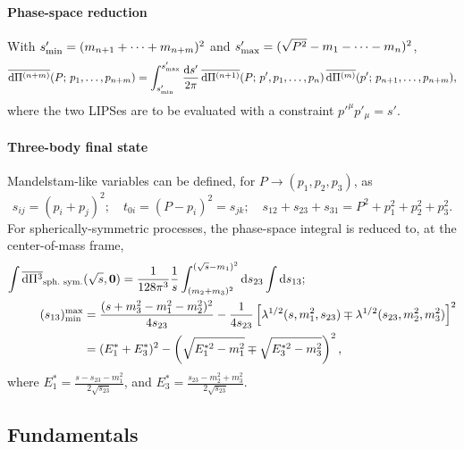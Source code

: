 \documentclass[CheatSheet]{subfiles}
\begin{document}
\paragraph{Phase-space reduction} With $s'\w{min}=(m_{n+1}+\cdots+m_{n+m})^2$ and $s'\w{max}=(\sqrt{P^2}-m_1-\cdots-m_n)^2$,
\begin{equation}
  \overline{\dd\Pi^{(n+m)}}(P;\,p_1,\dots,p_{n+m})
  =\int_{s'\w{min}}^{s'\w{max}}\frac{\dd s'}{2\pi}
  \,\overline{\dd\Pi^{(n+1)}}(P;\,p',p_{1},\dots,p_{n})
  \,\overline{\dd\Pi^{(m)}}(p';\,p_{n+1},\dots,p_{n+m}),
  \label{eq:psreduction}
\end{equation}
where the two LIPSes are to be evaluated with a constraint $p'^\mu p'_\mu=s'$.

\paragraph{Three-body final state} Mandelstam-like variables can be defined, for $P\to(p_1,p_2,p_3)$, as
\begin{equation*}
s_{ij}=(p_i+p_j)^2;\quad t_{0i}=(P-p_i)^2=s_{jk};\quad s_{12}+s_{23}+s_{31}=P^2+p_1^2+p_2^2+p_3^2.
\end{equation*}
For spherically-symmetric processes, the phase-space integral is reduced to, at the center-of-mass frame,
\begin{align}
\int\overline{\dd\Pi^3}_{\text{sph.\ sym.}}&(\sqrt{s}, \vc 0)
=\frac{1}{128\pi^3}\frac{1}{s}
\int_{(m_2+m_3)^2}^{(\sqrt{s}-m_1)^2}\dd s_{23}\int\dd s_{13};
\\ (s_{13})^{\text{max}}_{\text{min}} &=
\frac{(s+m_3^2-m_1^2-m_2^2)^2}{4s_{23}}
-\frac{1}{4s_{23}}
\left[\Kallen[1/2](s,m_1^2,s_{23})\mp\Kallen[1/2](s_{23},m_2^2,m_3^2)\right]^2
\notag\\&=(E_1^*+E_3^*)^2-\left(\sqrt{E_1^{*2}-m_1^2}\mp\sqrt{E_3^{*2}-m_3^2}\right)^2,
\quad
\end{align}
where 
$E_1^*=\frac{s-s_{23}-m_1^2}{2\sqrt{s_{23}}}$, and
$E_3^*=\frac{s_{23}-m_2^2+m_3^2}{2\sqrt{s_{23}}}$.

\newpage
\detailstyle
\subsection{Fundamentals}
\end{document}
